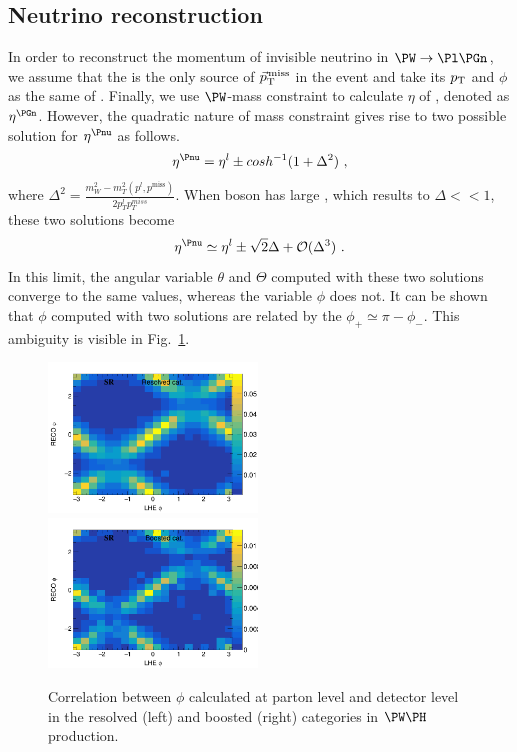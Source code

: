\documentclass[a4paper,11pt]{article}
\begin{document}
\subsection{Neutrino reconstruction}
\label{sec:neu_reco}

In order to reconstruct the momentum of invisible neutrino in $\PW \to \Pl \Pgn$, we assume that the \Pnu is the only source of ${\vec p}_{\mathrm{T}}^{\kern1pt\text{miss}}$ in the event and take its $p_{\mathrm{T}}$ and $\phi$ as the same of \Pnu. 
Finally, we use $\PW$-mass constraint to calculate $\eta$ of \Pnu, denoted as ${\eta}^{\Pgn}$. However, the quadratic nature of mass constraint gives rise to two possible solution for  ${\eta}^{\Pnu}$ as follows.
\begin{equation}
 {\eta}^{\Pnu} = {\eta}^{l} \pm cosh^{-1}(1+{\Delta}^2)	\ ,
\label{Eq:NeuEta}
\end{equation}
where ${\Delta}^2 = \frac{m_W^2 - m_T^2 ({p^l},{p^\text{miss}\xspace})}{2 p_T^{l} p_T^{miss}}$. 
When \PW boson has large \pt, which results to $\Delta << 1$, these two solutions become 
\begin{equation}
{\eta}^{\Pnu} \simeq {\eta}^{l} \pm \sqrt{2}{\Delta} + {\cal{O}} ({\Delta}^3)	\ .
\label{Eq:NeuEta2}
\end{equation}
In this limit,  the angular variable $\theta$ and $\Theta$ computed with these two solutions converge to the same values, whereas the variable $\phi$ does not. 
It can be shown that $\phi$ computed with two solutions are related by the $\phi_{+} \simeq \pi - \phi_{-}$. This ambiguity is visible in Fig.~\ref{fig:neureco}.
\begin{figure}[hbtp]
\begin{center}
\includegraphics[width=0.495\textwidth]{Figures/RECO/Resolved_Plot_2D_phi_unweighted.png}
\includegraphics[width=0.495\textwidth]{Figures/RECO/Boosted_Plot_2D_phi_unweighted.png}
\end{center}
\caption{
Correlation between $\phi$ calculated at parton level and detector level in the resolved (left) and boosted (right) categories in $\PW\PH$ production.
}
\label{fig:neureco}
\end{figure}
\end{document}
